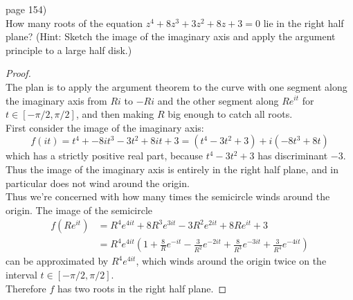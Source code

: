\documentclass{article}
\newenvironment{problem}[2][Problem]{\begin{trivlist}
\item[\hskip \labelsep {\bfseries #1}\hskip \labelsep {\bfseries #2.}]}{\end{trivlist}}
\begin{document}
\begin{problem}{3} (page 154) \\
  How many roots of the equation $z^4 + 8z^3 + 3z^2 + 8z + 3 = 0$ lie in the
  right half plane? (Hint: Sketch the image of the imaginary axis and apply the
  argument principle to a large half disk.)
\end{problem}

\begin{proof} \text{} \\
  The plan is to apply the argument theorem to the curve with one segment along
  the imaginary axis from $Ri$ to $-Ri$ and the other segment along $Re^{it}$
  for $t \in [-\pi/2, \pi/2]$, and then making $R$ big enough to catch all
  roots.\\
  First consider the image of the imaginary axis: \[
    f(it) = t^4 + -8it^3 - 3t^2 + 8it + 3 = (t^4 - 3t^2 + 3) + i(-8t^3 + 8t)
  \] which has a strictly positive real part, because $t^4 - 3t^2 + 3$
  has discriminant $-3$. Thus the image of the imaginary axis is entirely in the
  right half plane, and in particular does not wind around the origin.\\
  Thus we're concerned with how many times the semicircle winds around the
  origin. The image of the semicircle \begin{align*}
    f(Re^{it}) &=
      R^4 e^{4it}
      + 8R^3 e^{3it}
      - 3R^2 e^{2it}
      + 8R e^{it}
      + 3 \\
    &= R^4 e^{4it}\left(
      1 + \frac{8}{R}e^{-it}
      - \frac{3}{R^2}e^{-2it}
      + \frac{8}{R^3}e^{-3it}
      + \frac{3}{R^4}e^{-4it}
    \right)
  \end{align*} can be approximated by $R^4 e^{4it}$, which winds around the
  origin twice on the interval $t \in [-\pi/2, \pi/2]$.\\
  Therefore $f$ has two roots in the right half plane.
\end{proof}
\end{document}
